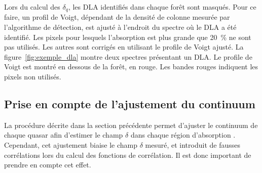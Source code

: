 Lors du calcul des $\delta_q$, les DLA identifiés dans chaque forêt sont masqués. Pour ce faire, un profil de Voigt, dépendant de la densité de colonne mesurée par l'algorithme de détection, est ajusté à l'endroit du spectre où le DLA a été identifié. Les pixels pour lesquels l'absorption est plus grande que \SI{20}{\percent} ne sont pas utilisés. Les autres sont corrigés en utilisant le profile de Voigt ajusté. La figure~\ref{fig:exemple_dla} montre deux spectres présentant un DLA. Le profile de Voigt est montré en dessous de la forêt, en rouge. Les bandes rouges indiquent les pixels non utilisés.


\subsection{Prise en compte de l'ajustement du continuum}
\label{subsec:projdelta}
La procédure décrite dans la section précédente permet d'ajuster le continuum de chaque quasar afin d'estimer le champ $\delta$ dans chaque région d'absorption \lya{}. Cependant, cet ajustement biaise le champ $\delta$ mesuré, et introduit de fausses corrélations lors du calcul des fonctions de corrélation. Il est donc important de prendre en compte cet effet.

